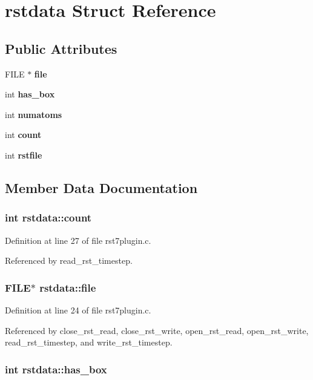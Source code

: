 \section{rstdata  Struct Reference}
\label{structrstdata}
\subsection*{Public Attributes}
\begin{CompactItemize}
\item 
FILE $\ast$ {\bf file}
\item 
int {\bf has\_\-box}
\item 
int {\bf numatoms}
\item 
int {\bf count}
\item 
int {\bf rstfile}
\end{CompactItemize}


\subsection{Member Data Documentation}
\subsubsection{\setlength{\rightskip}{0pt plus 5cm}int rstdata::count}\label{structrstdata_m3}




Definition at line 27 of file rst7plugin.c.

Referenced by read\_\-rst\_\-timestep.
\subsubsection{\setlength{\rightskip}{0pt plus 5cm}FILE$\ast$ rstdata::file}\label{structrstdata_m0}




Definition at line 24 of file rst7plugin.c.

Referenced by close\_\-rst\_\-read, close\_\-rst\_\-write, open\_\-rst\_\-read, open\_\-rst\_\-write, read\_\-rst\_\-timestep, and write\_\-rst\_\-timestep.
\subsubsection{\setlength{\rightskip}{0pt plus 5cm}int rstdata::has\_\-box}\label{structrstdata_m1}




